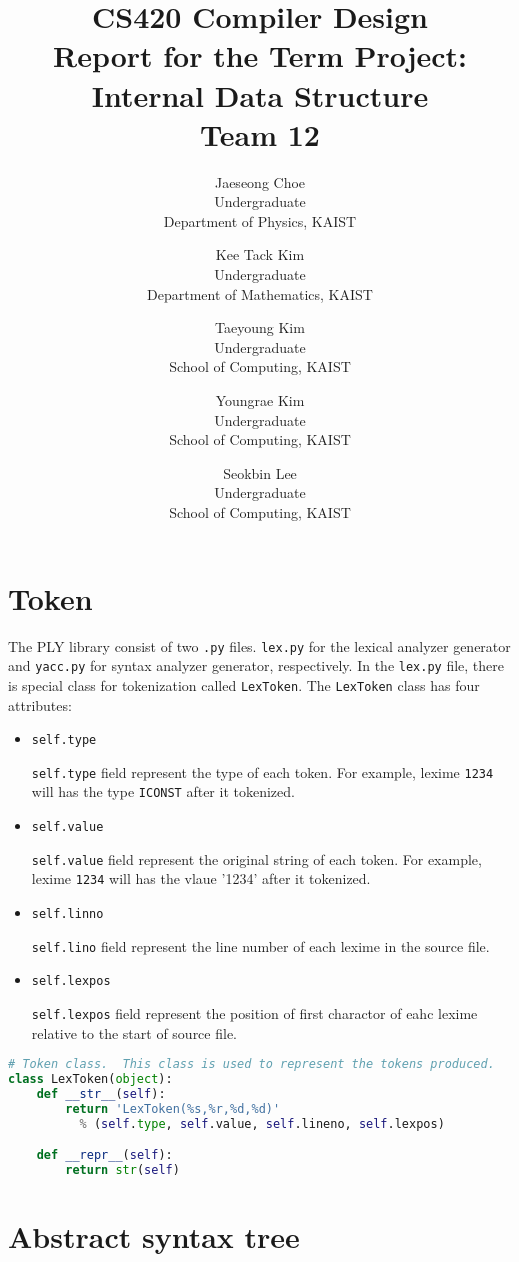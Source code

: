 \documentclass{article}
\title
{
	CS420 Compiler Design\\
	Report for the Term Project: Internal Data Structure\\
	${}$\\
	Team 12
}
\author
{
	Jaeseong Choe\\
	Undergraduate\\
	Department of Physics, KAIST
	\and
	Kee Tack Kim\\
	Undergraduate\\
	Department of Mathematics, KAIST
	\and
	Taeyoung Kim\\
	Undergraduate\\
	School of Computing, KAIST
	\and
	Youngrae Kim\\
	Undergraduate\\
	School of Computing, KAIST
	\and
	Seokbin Lee\\
	Undergraduate\\
	School of Computing, KAIST
}
\newcommand{\code}[1]{\texttt{#1}}
\begin{document}
	\maketitle

	\section{Token}

	The PLY library consist of two \code{.py} files. \code{lex.py} for the lexical analyzer generator and \code{yacc.py} for syntax analyzer generator, respectively. In the \code{lex.py} file, there is special class for tokenization called \code{LexToken}. The \code{LexToken} class has four attributes:

	\begin{itemize}
		\item \code{self.type}
		
		\code{self.type} field represent the type of each token. For example, lexime \code{1234} will has the type \code{ICONST} after it tokenized.

		\item \code{self.value}
		
		\code{self.value} field represent the original string of each token. For example, lexime \code{1234} will has the vlaue '1234' after it tokenized.

		\item \code{self.linno}
		
		\code{self.lino} field represent the line number of each lexime in the source file.

		\item \code{self.lexpos}
		
		\code{self.lexpos} field represent the position of first charactor of eahc lexime relative to the start of source file.

	\end{itemize}

	\begin{lstlisting}[language=Python]
# Token class.  This class is used to represent the tokens produced.
class LexToken(object):
    def __str__(self):
        return 'LexToken(%s,%r,%d,%d)'
          % (self.type, self.value, self.lineno, self.lexpos)

    def __repr__(self):
        return str(self)
	\end{lstlisting}


	\section{Abstract syntax tree}
\end{document}
